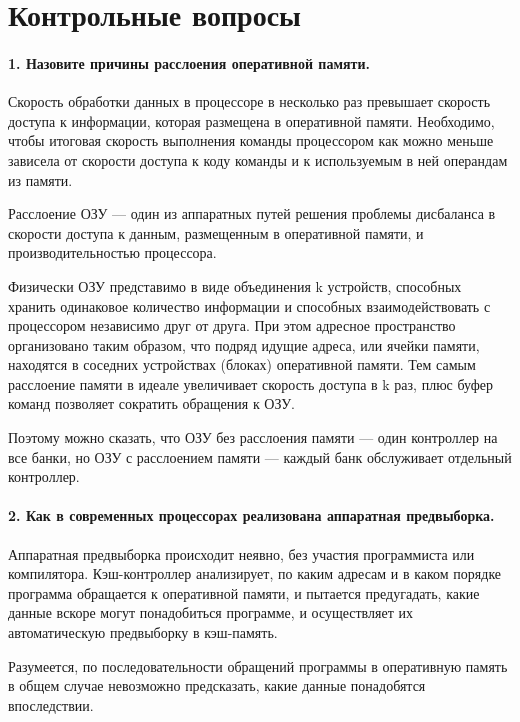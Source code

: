 \chapter*{Контрольные вопросы}

\subsubsection{1. Назовите причины расслоения оперативной памяти.}

Скорость обработки данных в процессоре в несколько раз превышает скорость доступа к информации, которая размещена в оперативной памяти. Необходимо, чтобы итоговая скорость выполнения команды процессором как можно меньше зависела от скорости доступа к коду команды и к используемым в ней операндам из памяти. 

Расслоение ОЗУ — один из аппаратных путей решения проблемы дисбаланса в скорости доступа к данным, размещенным в оперативной памяти, и производительностью процессора.

Физически ОЗУ представимо в виде объединения k устройств, способных хранить одинаковое количество информации и способных взаимодействовать с процессором независимо друг от друга. При этом адресное пространство организовано таким образом, что подряд идущие адреса, или ячейки памяти, находятся в соседних устройствах (блоках) оперативной памяти. Тем самым расслоение памяти в идеале увеличивает скорость доступа в k раз, плюс буфер команд позволяет сократить обращения к ОЗУ.

Поэтому можно сказать, что ОЗУ без расслоения памяти — один контроллер на все банки, но ОЗУ с расслоением памяти — каждый банк обслуживает отдельный контроллер.

\subsubsection{2. Как в современных процессорах реализована аппаратная предвыборка.}

Аппаратная предвыборка происходит неявно, без участия программиста или компилятора. Кэш-контроллер анализирует, по каким адресам и в каком порядке программа обращается к оперативной памяти, и пытается предугадать, какие данные вскоре могут понадобиться программе, и осуществляет их автоматическую предвыборку в кэш-память.

Разумеется, по последовательности обращений программы в оперативную память в общем случае невозможно предсказать, какие данные понадобятся впоследствии.

